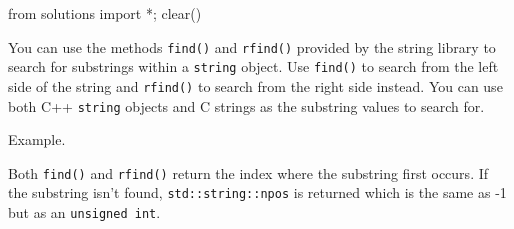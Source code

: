 \begin{python0}
from solutions import *; clear()
\end{python0}

You can use the methods \texttt{find()} and \texttt{rfind()} provided by the
string library to search for substrings within a \texttt{string} object.
Use \texttt{find()} to search from the left side of the string and
\texttt{rfind()} to search from the right side instead. You can use both
C++ \texttt{string} objects and C strings as the substring values to
search for.

Example.


Both \texttt{find()} and \texttt{rfind()} return the index where the
substring first occurs. If the substring isn't found,
\texttt{std::string::npos} is returned which is the same as -1 but as an
\texttt{unsigned int}.

